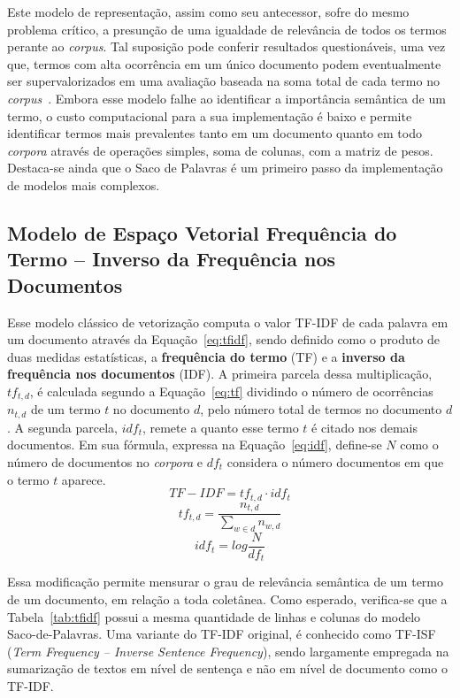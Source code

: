 \documentclass{SBCbookchapter}
\begin{document}
Este modelo de representação, assim como seu antecessor, sofre do mesmo problema crítico, a presunção de uma igualdade de relevância de todos os termos perante ao \textit{corpus}. Tal suposição pode conferir resultados questionáveis, uma vez que, termos com alta ocorrência em um único documento podem eventualmente ser supervalorizados em uma avaliação baseada na soma total de cada termo no \textit{corpus}~\cite{manning2010introduction}. Embora esse modelo falhe ao identificar a importância semântica de um termo, o custo computacional para a sua implementação é baixo e permite identificar termos mais prevalentes tanto em um documento quanto em todo \textit{corpora} através de operações simples, soma de colunas, com a matriz de pesos. Destaca-se ainda que o Saco de Palavras é um primeiro passo da implementação de modelos mais complexos.

\subsection{Modelo de Espaço Vetorial Frequência do Termo -- Inverso da Frequência nos Documentos}
Esse modelo clássico de vetorização computa o valor TF-IDF de cada palavra em um documento através da Equação~\ref{eq:tfidf}, sendo definido como o produto de duas medidas estatísticas, a \textbf{frequência do termo} (TF) e a \textbf{inverso da frequência nos documentos} (IDF). A primeira parcela dessa multiplicação, $tf_{t,d}$, é calculada segundo a Equação~\ref{eq:tf} dividindo o número de ocorrências $n_{t,d}$ de um termo $t$ no documento $d$, pelo número total de termos no documento $d$. A segunda parcela, $idf_{t}$, remete a quanto esse termo $t$ é citado nos demais documentos. Em sua fórmula, expressa na Equação~\ref{eq:idf}, define-se $N$ como o número de documentos no \textit{corpora} e $df_{t}$ considera o número documentos em que o termo $t$ aparece. 
\begin{equation}
    TF-IDF = tf_{t,d} \cdot idf_{t}
    \label{eq:tfidf}
\end{equation}
\begin{equation}
    tf_{t,d} = \frac{n_{t,d}}{\sum_{w\in d}^{}n_{w,d}}
    \label{eq:tf}
\end{equation}
\begin{equation}
    idf_{t} = log\frac{N}{df_{t}}
    \label{eq:idf}
\end{equation}

Essa modificação permite mensurar o grau de relevância semântica de um termo de um documento, em relação a toda coletânea. Como esperado, verifica-se que a Tabela~\ref{tab:tfidf} possui a mesma quantidade de linhas e colunas do modelo Saco-de-Palavras. Uma variante do TF-IDF original, é conhecido como TF-ISF (\textit{Term Frequency -- Inverse Sentence Frequency}), sendo largamente empregada na sumarização de textos em nível de sentença e não em nível de documento como o TF-IDF.
\end{document}
